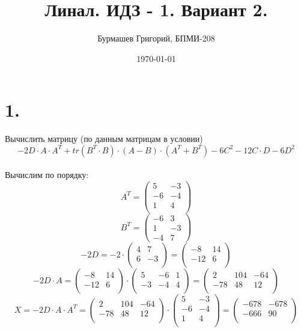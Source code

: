 \documentclass[a4paper,12pt]{article}
\author{Бурмашев Григорий, БПМИ-208}
\title{Линал. ИДЗ - 1. Вариант 2.}
\date{\today}
\begin{document}
\maketitle
\section*{1.} Вычислить матрицу (по данным матрицам в условии)
\[
-2D \cdot A \cdot A^T + tr(B^T \cdot B) \cdot (A-B) \cdot (A^T + B^T) - 6C^2 - 12C \cdot D - 6D^2
\]
\\
Вычислим по порядку:
\[
A^T = \begin{pmatrix}
5  & -3\\
-6 & -4\\
1 & 4\\
\end{pmatrix}
\]
\[
B^T = \begin{pmatrix}
-6 & 3\\
1 & -3\\
-4 & 7
\end{pmatrix}
\]
\[
-2D = -2 \cdot
\begin{pmatrix}
4 & 7\\
6& -3 \\
\end{pmatrix}
= 
\begin{pmatrix}
-8 & 14\\
-12 & 6\\
\end{pmatrix}
\]
\[
-2D \cdot A =\begin{pmatrix}
-8 & 14\\
-12 & 6\\
\end{pmatrix} \cdot
\begin{pmatrix}
5 & -6 & 1\\
-3 & -4 & 4\\
\end{pmatrix} = 
\begin{pmatrix}
2 & 104 & -64 \\
-78 & 48 & 12\\
\end{pmatrix}
\]
\[
X = -2D \cdot A \cdot A^T = \begin{pmatrix}
2 & 104 & -64 \\
-78 & 48 & 12\\
\end{pmatrix} \cdot
\begin{pmatrix}
5  & -3\\
-6 & -4\\
1 & 4\\
\end{pmatrix} = 
\begin{pmatrix}
-678 & -678\\
-666 & 90\\
\end{pmatrix}
\]
\end{document}
